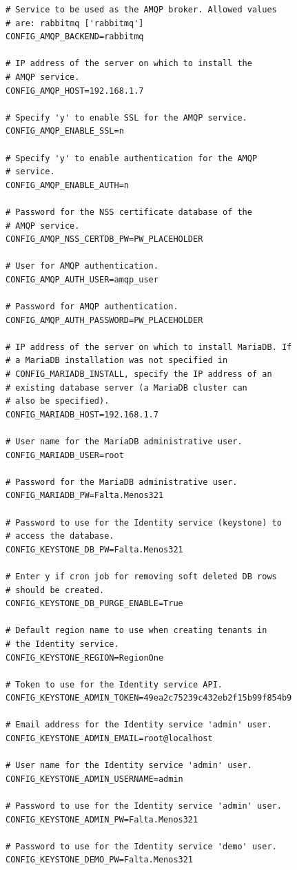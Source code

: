 \documentclass[12pt,a4paper,oneside]{book}
\begin{document}
\begin{lstlisting}[style=codigobase,  caption= answers.cfg]
# Service to be used as the AMQP broker. Allowed values
# are: rabbitmq ['rabbitmq']
CONFIG_AMQP_BACKEND=rabbitmq

# IP address of the server on which to install the 
# AMQP service.
CONFIG_AMQP_HOST=192.168.1.7

# Specify 'y' to enable SSL for the AMQP service.
CONFIG_AMQP_ENABLE_SSL=n

# Specify 'y' to enable authentication for the AMQP
# service.
CONFIG_AMQP_ENABLE_AUTH=n

# Password for the NSS certificate database of the 
# AMQP service.
CONFIG_AMQP_NSS_CERTDB_PW=PW_PLACEHOLDER

# User for AMQP authentication.
CONFIG_AMQP_AUTH_USER=amqp_user

# Password for AMQP authentication.
CONFIG_AMQP_AUTH_PASSWORD=PW_PLACEHOLDER

# IP address of the server on which to install MariaDB. If
# a MariaDB installation was not specified in 
# CONFIG_MARIADB_INSTALL, specify the IP address of an 
# existing database server (a MariaDB cluster can
# also be specified).
CONFIG_MARIADB_HOST=192.168.1.7

# User name for the MariaDB administrative user.
CONFIG_MARIADB_USER=root

# Password for the MariaDB administrative user.
CONFIG_MARIADB_PW=Falta.Menos321

# Password to use for the Identity service (keystone) to 
# access the database.
CONFIG_KEYSTONE_DB_PW=Falta.Menos321

# Enter y if cron job for removing soft deleted DB rows 
# should be created.
CONFIG_KEYSTONE_DB_PURGE_ENABLE=True

# Default region name to use when creating tenants in 
# the Identity service.
CONFIG_KEYSTONE_REGION=RegionOne

# Token to use for the Identity service API.
CONFIG_KEYSTONE_ADMIN_TOKEN=49ea2c75239c432eb2f15b99f854b9

# Email address for the Identity service 'admin' user.
CONFIG_KEYSTONE_ADMIN_EMAIL=root@localhost

# User name for the Identity service 'admin' user.
CONFIG_KEYSTONE_ADMIN_USERNAME=admin

# Password to use for the Identity service 'admin' user.
CONFIG_KEYSTONE_ADMIN_PW=Falta.Menos321

# Password to use for the Identity service 'demo' user.
CONFIG_KEYSTONE_DEMO_PW=Falta.Menos321


\end{lstlisting}
\end{document}
